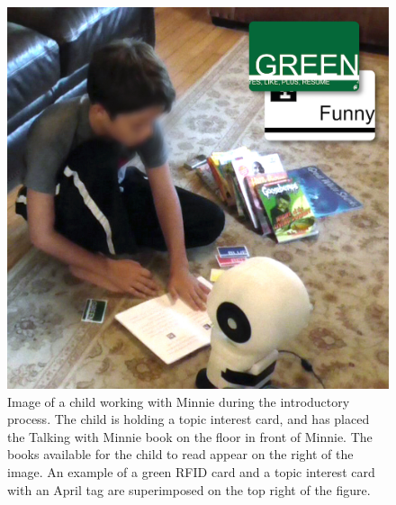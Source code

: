 \documentclass{sigchi}
\begin{document}
\begin{figure}
	\centering
	\includegraphics[width=1\columnwidth]{figures/Child-with-Minnie}
	\caption{Image of a child working with Minnie during the introductory process. The child is holding a topic interest card, and has placed the Talking with Minnie book on the floor in front of Minnie. The books available for the child to read appear on the right of the image. An example of a green RFID card and a topic interest card with an April tag are superimposed on the top right of the figure.}
	\label{fig:figure3}
\end{figure}
\end{document}
